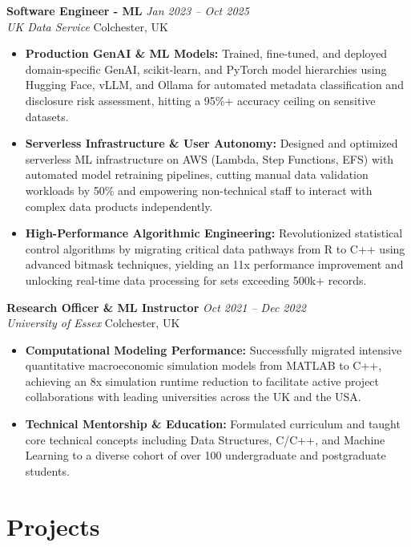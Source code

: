 \documentclass[11pt,a4paper]{article}
\begin{document}
\noindent \textbf{Software Engineer - ML} \hfill \textit{Jan 2023 -- Oct 2025} \\
\textit{UK Data Service} \hfill Colchester, UK
\begin{itemize}
    \item \textbf{Production GenAI \& ML Models:} Trained, fine-tuned, and deployed domain-specific GenAI, scikit-learn, and PyTorch model hierarchies using Hugging Face, vLLM, and Ollama for automated metadata classification and disclosure risk assessment, hitting a 95\%+ accuracy ceiling on sensitive datasets.
    \item \textbf{Serverless Infrastructure \& User Autonomy:} Designed and optimized serverless ML infrastructure on AWS (Lambda, Step Functions, EFS) with automated model retraining pipelines, cutting manual data validation workloads by 50\% and empowering non-technical staff to interact with complex data products independently.
    \item \textbf{High-Performance Algorithmic Engineering:} Revolutionized statistical control algorithms by migrating critical data pathways from R to C++ using advanced bitmask techniques, yielding an 11x performance improvement and unlocking real-time data processing for sets exceeding 500k+ records.
\end{itemize}

\vspace{6pt}

\noindent \textbf{Research Officer \& ML Instructor} \hfill \textit{Oct 2021 -- Dec 2022} \\
\textit{University of Essex} \hfill Colchester, UK
\begin{itemize}
    \item \textbf{Computational Modeling Performance:} Successfully migrated intensive quantitative macroeconomic simulation models from MATLAB to C++, achieving an 8x simulation runtime reduction to facilitate active project collaborations with leading universities across the UK and the USA.
    \item \textbf{Technical Mentorship \& Education:} Formulated curriculum and taught core technical concepts including Data Structures, C/C++, and Machine Learning to a diverse cohort of over 100 undergraduate and postgraduate students.
\end{itemize}

\section*{Projects}
\end{document}
